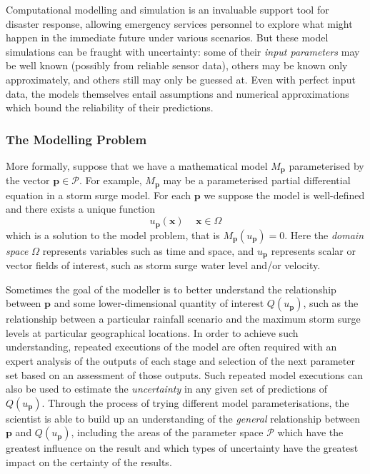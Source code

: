 \documentclass[a4paper,fontsize=12pt]{scrartcl}
\begin{document}
Computational modelling and simulation is an invaluable support tool
for disaster response, allowing emergency services personnel to
explore what might happen in the immediate future under various
scenarios. But these model simulations can be fraught with
uncertainty: some of their \emph{input parameters} may be well known
(possibly from reliable sensor data), others may be known only
approximately, and others still may only be guessed at. Even with
perfect input data, the models themselves entail assumptions and
numerical approximations which bound the reliability of their
predictions.

\subsubsection*{The Modelling Problem}

More formally, suppose that we have a mathematical model
$M_{\mathbf{p}}$ parameterised by the vector
$\mathbf{p}\in\mathcal{P}$. For example, $M_{\mathbf{p}}$ may be a
parameterised partial differential equation %
in a storm surge model. For each $\mathbf{p}$ we suppose the model is
well-defined and there exists a unique function
\begin{equation}
  \label{eq:1}
  u_{\mathbf{p}}(\mathbf{x})\, \quad \mathbf{x}\in\Omega
\end{equation}
which is a solution to the model problem, that is $M_{\mathbf{p}}(u_{\mathbf{p}})=0$.
Here the \emph{domain space} $\Omega$ represents variables such as 
time and space, 
and $u_{\mathbf{p}}$ represents scalar or vector fields of interest, 
such as storm surge water level and/or velocity.    

Sometimes the goal of the modeller is to better understand the
relationship between $\mathbf{p}$ and some lower-dimensional quantity
of interest $Q(u_{\mathbf{p}})$, such as the relationship between a
particular rainfall scenario and the maximum storm surge levels at
particular geographical locations. In order to achieve such
understanding, repeated executions of the model are often required
with an expert analysis of the outputs of each stage and selection of
the next parameter set based on an assessment of those outputs. Such
repeated model executions can also be used to estimate the
\emph{uncertainty} in any given set of predictions of
$Q(u_{\mathbf{p}})$. Through the process of trying different model
parameterisations, the scientist is able to build up an understanding
of the \emph{general} relationship between $\mathbf{p}$ and
$Q(u_{\mathbf{p}})$, including the areas of the parameter space
$\mathcal{P}$ which have the greatest influence on the result and
which types of uncertainty have the greatest impact on the certainty
of the results.
\end{document}
